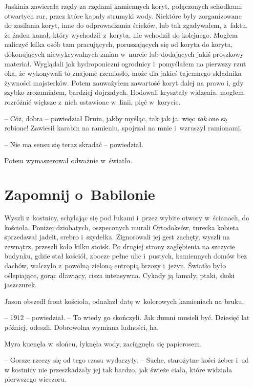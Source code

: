 \documentclass[oneside,polish,11pt,sfheadings]{mwbk}
\begin{document}
Jaskinia zawierała rzędy za rzędami kamiennych koryt, połączonych
schodkami otwartych rur, przez które kapały strumyki wody. Niektóre były
zorganizowane do zasilania koryt, inne do odprowadzania ścieków, lub tak
zgadywałem, z~faktu, że żaden kanał, który wychodził z~koryta, nie
wchodził do kolejnego. Mogłem naliczyć kilka osób tam pracujących,
poruszających się od koryta do koryta, dokonujących niewykrywalnych
zmian w~nurcie lub dodających jakiś proszkowy materiał. Wyglądali jak
hydroponiczni ogrodnicy i~pomyślałem na pierwszy rzut oka, że wykonywali
to znajome rzemiosło, może dla jakieś tajemnego składnika żywności
majsterków. Potem zauważyłem zawartość koryt dalej na prawo i, gdy
szybko zrozumiałem, bardziej dojrzałych. Hodowali kryształy widzenia,
mogłem rozróżnić większe z~nich ustawione w~linii, pięć w~korycie.

-- Cóż, dobra -- powiedział Druin, jakby myśląc, tak jak ja: więc
\textit{tak} one są robione! Zawiesił karabin na ramieniu, spojrzał na
mnie i~wzruszył ramionami.

-- Nie ma sensu się teraz skradać -- powiedział.

Potem wymaszerował odważnie w~światło.


\chapter{Zapomnij o~Babilonie}

Wyszli z~kostnicy, schylając się pod łukami i~przez wybite otwory w~ścianach, do kościoła. Poniżej dziobatych, oszpeconych murali
Ortodoksów, turecka kobieta sprzedawał jadeit, srebro i~szydełka.
Zignorowali jej gest zachęty, wyszli na zewnątrz, przeszli koło kilku
stoisk. Po drugiej strony zagłębienia na szczycie budynku, gdzie stał
kościół, zbocze pełne ulic i~pustych, kamiennych domów bez dachów,
walczyło z~powolną zieloną entropią brzozy i~jeżyn. Światło było
oślepiające, gorąc dławiący, cisza intensywna. Cykady ją łamały, ptaki,
skoki jaszczurek.

Jason obszedł front kościoła, odnalazł datę w~kolorowych kamieniach na
bruku.

-- 1912 -- powiedział. -- To wtedy go skończyli. Jak dumni musieli być.
Dziesięć lat później, odeszli. Dobrowolna wymiana ludności, ha.

Myra kucnęła w~słońcu, łyknęła wody, zaciągnęła się papierosem. 

-- Gorsze rzeczy się od tego czasu wydarzyły. -- Suche, starożytne kości żeber i~ud
w kostnicy nie przeszkadzały jej tak bardzo, jak świeże ciała, które
widziała pierwszego wieczoru.
\end{document}
